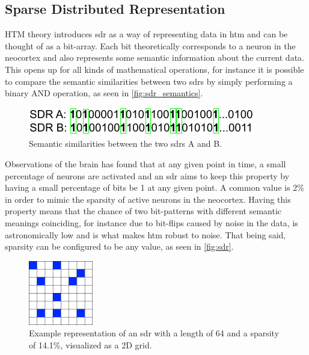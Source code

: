 \subsection{Sparse Distributed Representation}
HTM theory introduces \gls*{sdr} as a way of representing data in \gls*{htm} and can be thought of as a bit-array. Each bit theoretically corresponds to a neuron in the neocortex and also represents some semantic information about the current data. This opens up for all kinds of mathematical operations, for instance it is possible to compare the semantic similarities between two \glspl*{sdr} by simply performing a binary AND operation, as seen in \autoref{fig:sdr_semantics}.
\begin{figure}[H]
    \centering
    \includegraphics{resources/related_works/sdr-semantics.png}
    \caption[SDR Semantic Comparison]{Semantic similarities between the two \glspl*{sdr} A and B.}
    \label{fig:sdr_semantics}
\end{figure}
Observations of the brain has found that at any given point in time, a small percentage of neurons are activated and an \gls*{sdr} aims to keep this property by having a small percentage of bits be 1 at any given point. A common value is 2\% in order to mimic the sparsity of active neurons in the neocortex. Having this property means that the chance of two bit-patterns with different semantic meanings coinciding, for instance due to bit-flips caused by noise in the data, is astronomically low and is what makes \gls*{htm} robust to noise. That being said, sparsity can be configured to be any value, as seen in \autoref{fig:sdr}.
\begin{figure}[H]
    \centering
    \includegraphics[width=0.25\textwidth]{resources/related_works/SDR.png}
    \caption[Example SDR]{Example representation of an \gls*{sdr} with a length of 64 and a sparsity of 14.1\%, visualized as a 2D grid.}
    \label{fig:sdr}
\end{figure}
